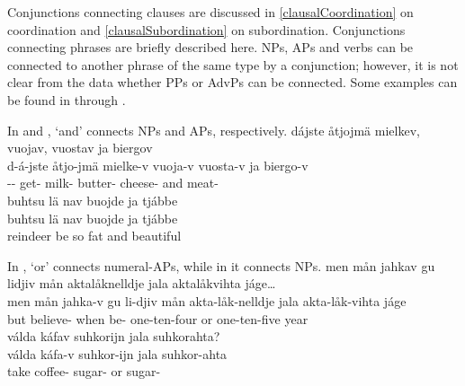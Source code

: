 Conjunctions connecting clauses are discussed in \SEC\ref{clausalCoordination} on coordination and \SEC\ref{clausalSubordination} on subordination. 
Conjunctions connecting phrases are briefly described here. 
NPs, APs and verbs can be connected to another phrase of the same type by a conjunction; however, it is not clear from the data whether PPs or AdvPs can be connected. 
Some examples can be found in  through . 

In  and ,  ‘and’ connects NPs and APs, respectively. 
\ea\label{conjunctionEx1}%
\glll	dájste åtjojmä mielkev, vuojav, vuostav ja biergov\\
	d-á-jste åtjo-jmä mielke-v vuoja-v vuosta-v ja biergo-v\\
	-- get- milk- butter- cheese- and meat-\\\nopagebreak
{}	
\z
\ea\label{conjunctionEx2}%
\glll	buhtsu lä nav buojde ja tjábbe\\
	buhtsu lä nav buojde ja tjábbe\\
	reindeer\BS{} be\BS{} so fat\BS{} and beautiful\BS{} \\\nopagebreak
{}	
\z

In ,  ‘or’ connects numeral-APs, while in  it connects NPs. 
\ea\label{conjunctionEx3}%
\glll	men mån jahkav gu lidjiv mån aktalåknelldje jala aktalåkvihta jáge…\\
	men mån jahka-v gu li-djiv mån akta-låk-nelldje jala akta-låk-vihta jáge\\
	but  believe- when be-  one-ten-four or one-ten-five year\BS{}\\\nopagebreak
{}	
\z
\ea\label{conjunctionEx4}%
\glll	válda káfav suhkorijn jala suhkorahta?\\
	válda káfa-v suhkor-ijn jala suhkor-ahta\\
	take\BS{} coffee- sugar- or sugar-\\\nopagebreak
{}	
\z

